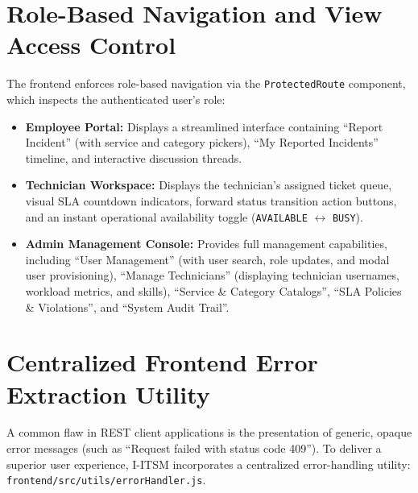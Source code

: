 \documentclass[11pt,a4paper,oneside]{report}
\begin{document}
\section{Role-Based Navigation and View Access Control}
\label{sec:frontend_rbac}
The frontend enforces role-based navigation via the \texttt{ProtectedRoute} component, which inspects the authenticated user's role:
\begin{itemize}
    \item \textbf{Employee Portal:} Displays a streamlined interface containing ``Report Incident'' (with service and category pickers), ``My Reported Incidents'' timeline, and interactive discussion threads.
    \item \textbf{Technician Workspace:} Displays the technician's assigned ticket queue, visual SLA countdown indicators, forward status transition action buttons, and an instant operational availability toggle (\texttt{AVAILABLE} $\leftrightarrow$ \texttt{BUSY}).
    \item \textbf{Admin Management Console:} Provides full management capabilities, including ``User Management'' (with user search, role updates, and modal user provisioning), ``Manage Technicians'' (displaying technician usernames, workload metrics, and skills), ``Service \& Category Catalogs'', ``SLA Policies \& Violations'', and ``System Audit Trail''.
\end{itemize}

\section{Centralized Frontend Error Extraction Utility}
\label{sec:frontend_error_util}
A common flaw in REST client applications is the presentation of generic, opaque error messages (such as ``Request failed with status code 409''). To deliver a superior user experience, I-ITSM incorporates a centralized error-handling utility: \texttt{frontend/src/utils/errorHandler.js}.
\end{document}
